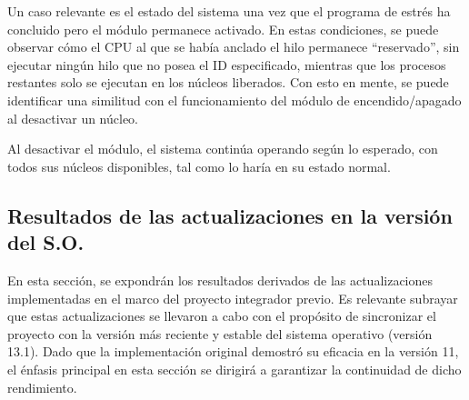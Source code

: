 


Un caso relevante es el estado del sistema una vez que el programa de estrés ha concluido pero el módulo permanece activado. En estas condiciones, se puede observar cómo el CPU al que se había anclado el hilo permanece “reservado”, sin ejecutar ningún hilo que no posea el ID especificado, mientras que los procesos restantes solo se ejecutan en los núcleos liberados. Con esto en mente, se puede identificar una similitud con el funcionamiento del módulo de encendido/apagado al desactivar un núcleo.\par

Al desactivar el módulo, el sistema continúa operando según lo esperado, con todos sus núcleos disponibles, tal como lo haría en su estado normal.


\subsection{Resultados de las actualizaciones en la versión del S.O.}
En esta sección, se expondrán los resultados derivados de las actualizaciones implementadas en el marco del proyecto integrador previo. Es relevante subrayar que estas actualizaciones se llevaron a cabo con el propósito de sincronizar el proyecto con la versión más reciente y estable del sistema operativo (versión 13.1). Dado que la implementación original demostró su eficacia en la versión 11, el énfasis principal en esta sección se dirigirá a garantizar la continuidad de dicho rendimiento.\par

